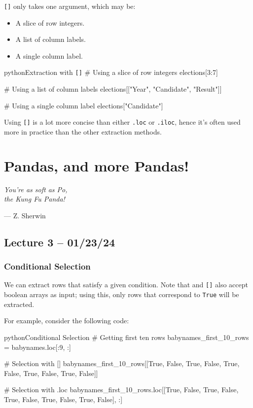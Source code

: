\documentclass[openany]{book}
\begin{document}
\texttt{[]} only takes one argument, which may be:
\begin{itemize}
	\item A slice of row integers.
	\item A list of column labels.
	\item A single column label.
\end{itemize}

\begin{code}{python}{Extraction with \texttt{[]}}
# Using a slice of row integers
elections[3:7]

# Using a list of column labels
elections[["Year", "Candidate", "Result"]]

# Using a single column label
elections["Candidate"]
\end{code}

Using \texttt{[]} is a lot more concise than either \texttt{.loc} or \texttt{.iloc}, hence it's often used more in practice than the other extraction methods.

\chapter{Pandas, and more Pandas!}
\epigraph{\textit{You're as soft as Po,\\the Kung Fu Panda!}}{--- Z. Sherwin}

\section{Lecture 3 -- 01/23/24}
\subsection{Conditional Selection}
We can extract rows that satisfy a given condition. Note that  and \texttt{[]} also accept boolean arrays as input; using this, only rows that correspond to \texttt{True} will be extracted.

For example, consider the following code:
\begin{code}{python}{Conditional Selection}
# Getting first ten rows
babynames_first_10_rows = babynames.loc[:9, :]

# Selection with []
babynames_first_10_rows[[True, False, True, False, True, False, True, False, True, False]]

# Selection with .loc
babynames_first_10_rows.loc[[True, False, True, False, True, False, True, False, True, False], :]
\end{code}
\end{document}
